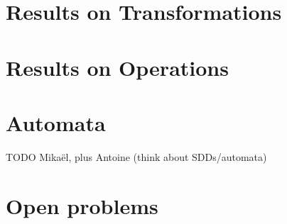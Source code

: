 \documentclass[letterpaper,11pt]{article}
\begin{document}
\section{Results on Transformations} \label{sec:res_trans}


\section{Results on Operations} \label{sec:res_ops}


\section{Automata} \label{sec:automata}
TODO Mikaël, plus Antoine (think about SDDs/automata)



\section{Open problems} \label{sec:open_problems}




\end{document}
